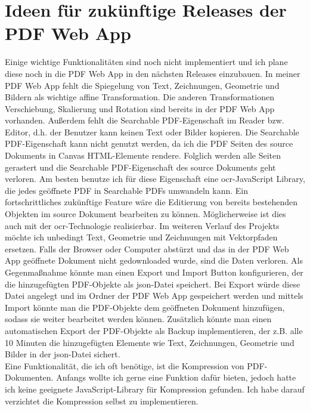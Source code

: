 \section{Ideen für zukünftige Releases der PDF Web App}
Einige wichtige Funktionalitäten sind noch nicht implementiert und ich plane diese noch in die PDF Web App in den nächsten Releases einzubauen. In meiner PDF Web App fehlt die Spiegelung von Text, Zeichnungen, Geometrie und Bildern als wichtige affine Transformation. Die anderen Transformationen Verschiebung, Skalierung und Rotation sind bereits in der PDF Web App vorhanden. Außerdem fehlt die Searchable PDF-Eigenschaft im Reader bzw. Editor, d.h. der Benutzer kann keinen Text oder Bilder kopieren. Die Searchable PDF-Eigenschaft kann nicht genutzt werden, da ich die PDF Seiten des source Dokuments in Canvas HTML-Elemente rendere. Folglich werden alle Seiten gerastert und die Searchable PDF-Eigenschaft des source Dokuments geht verloren. Am besten benutze ich für diese Eigenschaft eine \gls{ocr}-JavaScript Library, die jedes geöffnete PDF in Searchable PDFs umwandeln kann. Ein fortschrittliches zukünftige Feature wäre die Editierung von bereits bestehenden Objekten im source Dokument bearbeiten zu können. Möglicherweise ist dies auch mit der \gls{ocr}-Technologie realisierbar. Im weiteren Verlauf des Projekts möchte ich unbedingt Text, Geometrie und Zeichnungen mit Vektorpfaden ersetzen. Falls der Browser oder Computer abstürzt und das in der PDF Web App geöffnete Dokument nicht gedownloaded wurde, sind die Daten verloren. Als Gegenmaßnahme könnte man einen Export und Import Button konfigurieren, der die hinzugefügten PDF-Objekte als \gls{json}-Datei speichert. Bei Export würde diese Datei angelegt und im Ordner der PDF Web App gespeichert werden und mittels Import könnte man die PDF-Objekte dem geöffneten Dokument hinzufügen, sodass sie weiter bearbeitet werden können. Zusätzlich könnte man einen automatischen Export der PDF-Objekte als Backup implementieren, der z.B. alle 10 Minuten die hinzugefügten Elemente wie Text, Zeichnungen, Geometrie und Bilder in der \gls{json}-Datei sichert. \\
Eine Funktionalität, die ich oft benötige, ist die Kompression von PDF-Dokumenten. Anfangs wollte ich gerne eine Funktion dafür bieten, jedoch hatte ich keine geeignete JavaScript-Library für Kompression gefunden. Ich habe darauf verzichtet die Kompression selbst zu implementieren. 